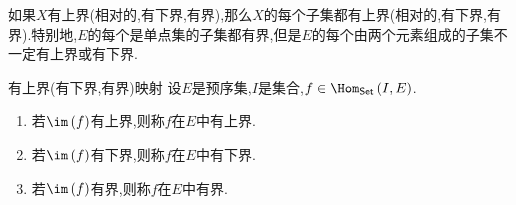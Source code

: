 \begin{remark}{}{}
	如果$X$有上界(相对的,有下界,有界),那么$X$的每个子集都有上界(相对的,有下界,有界).特别地,$E$的每个是单点集的子集都有界,但是$E$的每个由两个元素组成的子集不一定有上界或有下界.
\end{remark}

\begin{definition}{有上界(有下界,有界)映射}{}
	设$E$是预序集,$I$是集合,$f\in\Hom_{\mathsf{Set}}\left(I,E\right)$.
	\begin{enumerate}
		\item 若$\im\left(f\right)$有上界,则称$f$在$E$中有上界.
		\item 若$\im\left(f\right)$有下界,则称$f$在$E$中有下界.
		\item 若$\im\left(f\right)$有界,则称$f$在$E$中有界.
	\end{enumerate}
\end{definition}





























